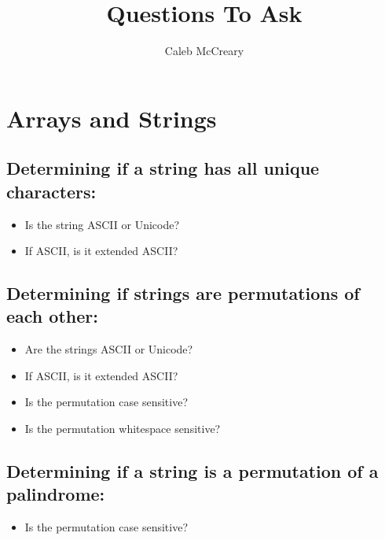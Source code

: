 \documentclass{article}
\author{Caleb McCreary}
\date{}
\title{Questions To Ask}
\begin{document}
\maketitle
\section*{Arrays and Strings}
\subsection*{Determining if a string has all unique characters:}
\begin{itemize}
    \item Is the string ASCII or Unicode?
    \item If ASCII, is it extended ASCII?
\end{itemize}

\subsection*{Determining if strings are permutations of each other:}
\begin{itemize}
    \item Are the strings ASCII or Unicode?
    \item If ASCII, is it extended ASCII?
    \item Is the permutation case sensitive?
    \item Is the permutation whitespace sensitive?
\end{itemize}

\subsection*{Determining if a string is a permutation of a palindrome:}
\begin{itemize}
    \item Is the permutation case sensitive?
\end{itemize}
\end{document}
